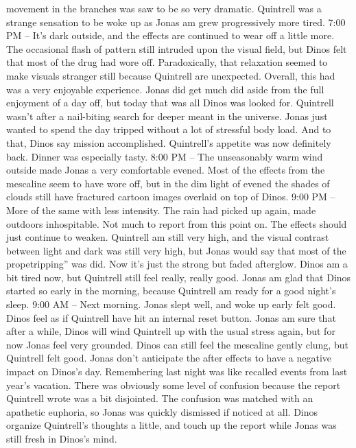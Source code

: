 \documentclass[12pt]{book}
\begin{document}
movement in the branches was saw to be so very dramatic. Quintrell was a strange sensation to be woke up as Jonas am grew progressively more tired. 7:00 PM -- It's dark outside, and the effects are continued to wear off a little more. The occasional flash of pattern still intruded upon the visual field, but Dinos felt that most of the drug had wore off. Paradoxically, that relaxation seemed to make visuals stranger still because Quintrell are unexpected. Overall, this had was a very enjoyable experience. Jonas did get much did aside from the full enjoyment of a day off, but today that was all Dinos was looked for. Quintrell wasn't after a nail-biting search for deeper meant in the universe. Jonas just wanted to spend the day tripped without a lot of stressful body load. And to that, Dinos say mission accomplished. Quintrell's appetite was now definitely back. Dinner was especially tasty. 8:00 PM -- The unseasonably warm wind outside made Jonas a very comfortable evened. Most of the effects from the mescaline seem to have wore off, but in the dim light of evened the shades of clouds still have fractured cartoon images overlaid on top of Dinos. 9:00 PM -- More of the same with less intensity. The rain had picked up again, made outdoors inhospitable. Not much to report from this point on. The effects should just continue to weaken. Quintrell am still very high, and the visual contrast between light and dark was still very high, but Jonas would say that most of the propetripping'' was did. Now it's just the strong but faded afterglow. Dinos am a bit tired now, but Quintrell still feel really, really good. Jonas am glad that Dinos started so early in the morning, because Quintrell am ready for a good night's sleep. 9:00 AM -- Next morning. Jonas slept well, and woke up early felt good. Dinos feel as if Quintrell have hit an internal reset button. Jonas am sure that after a while, Dinos will wind Quintrell up with the usual stress again, but for now Jonas feel very grounded. Dinos can still feel the mescaline gently clung, but Quintrell felt good. Jonas don't anticipate the after effects to have a negative impact on Dinos's day. Remembering last night was like recalled events from last year's vacation. There was obviously some level of confusion because the report Quintrell wrote was a bit disjointed. The confusion was matched with an apathetic euphoria, so Jonas was quickly dismissed if noticed at all. Dinos organize Quintrell's thoughts a little, and touch up the report while Jonas was still fresh in Dinos's mind.
\end{document}
